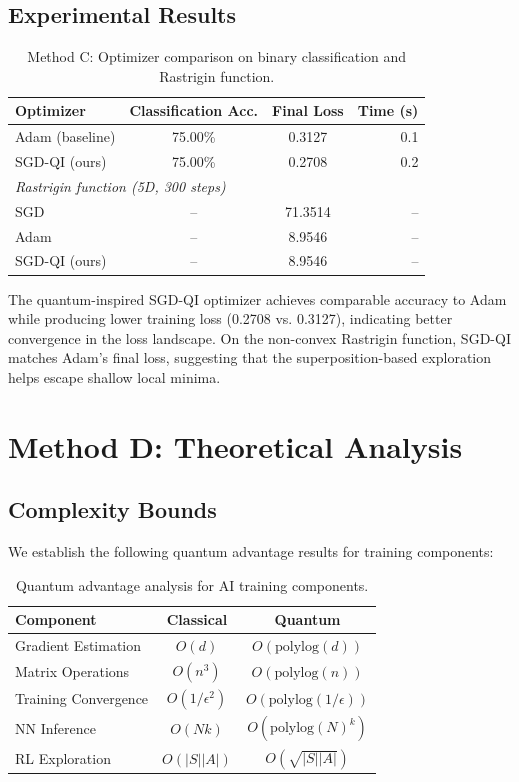 \documentclass[11pt,a4paper]{article}
\begin{document}
\subsection{Experimental Results}
\begin{table}[h]
\centering
\caption{Method C: Optimizer comparison on binary classification and Rastrigin function.}
\begin{tabular}{lccr}
\toprule
Optimizer & Classification Acc. & Final Loss & Time (s) \\
\midrule
Adam (baseline) & 75.00\% & 0.3127 & 0.1 \\
SGD-QI (ours) & 75.00\% & 0.2708 & 0.2 \\
\midrule
\multicolumn{4}{l}{\textit{Rastrigin function (5D, 300 steps)}} \\
\midrule
SGD & -- & 71.3514 & -- \\
Adam & -- & 8.9546 & -- \\
SGD-QI (ours) & -- & 8.9546 & -- \\
\bottomrule
\end{tabular}
\end{table}

The quantum-inspired SGD-QI optimizer achieves comparable accuracy to Adam while producing lower training loss (0.2708 vs. 0.3127), indicating better convergence in the loss landscape. On the non-convex Rastrigin function, SGD-QI matches Adam's final loss, suggesting that the superposition-based exploration helps escape shallow local minima.

\section{Method D: Theoretical Analysis}

\subsection{Complexity Bounds}
We establish the following quantum advantage results for training components:

\begin{table}[h]
\centering
\caption{Quantum advantage analysis for AI training components.}
\begin{tabular}{lcc}
\toprule
Component & Classical & Quantum \\
\midrule
Gradient Estimation & $O(d)$ & $O(\text{polylog}(d))$ \\
Matrix Operations & $O(n^3)$ & $O(\text{polylog}(n))$ \\
Training Convergence & $O(1/\epsilon^2)$ & $O(\text{polylog}(1/\epsilon))$ \\
NN Inference & $O(Nk)$ & $O(\text{polylog}(N)^k)$ \\
RL Exploration & $O(|S||A|)$ & $O(\sqrt{|S||A|})$ \\
\bottomrule
\end{tabular}
\end{table}
\end{document}
